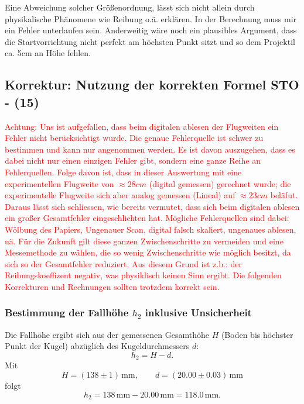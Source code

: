 \documentclass{article}
\begin{document}
\noindent
Eine Abweichung solcher Größenordnung, lässt sich nicht allein durch physikalische Phänomene wie Reibung o.ä. erklären. In der Berechnung muss mir ein Fehler unterlaufen sein. Anderweitig wäre noch ein plausibles Argument, dass die Startvorrichtung nicht perfekt am höchsten Punkt sitzt und so dem Projektil ca. 5cm an Höhe fehlen. 



\subsection{Korrektur: Nutzung der korrekten Formel STO - (15)}



\textcolor{red}{Achtung: Uns ist aufgefallen, dass beim digitalen ablesen der Flugweiten ein Fehler nicht berücksichtigt wurde. Die genaue Fehlerquelle ist schwer zu bestimmen und kann nur angenommen werden. Es ist davon auszugehen, dass es dabei nicht nur einen einzigen Fehler gibt, sondern eine ganze Reihe an Fehlerquellen. Folge davon ist, dass in dieser Auswertung mit eine experimentellen Flugweite von $\approx 28cm$ (digital gemessen) gerechnet wurde; die experimentelle Flugweite sich aber analog gemessen (Lineal) auf $\approx 23cm$ beläfut. Daraus lässt sich schliessen, wie bereits vermutet, dass sich beim digitalen ablesen ein großer Gesamtfehler eingeschlichten hat. Mögliche Fehlerquellen sind dabei: Wölbung des Papiers, Ungenauer Scan, digital falsch skaliert, ungenaues ablesen, uä. Für die Zukunft gilt diese ganzen Zwischenschritte zu vermeiden und eine Messemethode zu wählen, die so wenig Zwischenschritte wie möglich besitzt, da sich so der Gesamtfehler reduziert. Aus diesem Grund ist z.b.: der Reibungskoeffizent negativ, was physiklisch keinen Sinn ergibt. Die folgenden Korrekturen und Rechnungen sollten trotzdem korrekt sein.}




%

\subsubsection*{Bestimmung der Fallhöhe \(h_2\) inklusive Unsicherheit}
Die Fallhöhe ergibt sich aus der gemessenen Gesamthöhe \(H\) (Boden bis höchster Punkt der Kugel)
abzüglich des Kugeldurchmessers \(d\):
\begin{equation}
h_2 = H - d.
\end{equation}
Mit
\begin{equation}
H = (138 \pm 1)\,\mathrm{mm}, \qquad d = (20.00 \pm 0.03)\,\mathrm{mm}
\end{equation}
folgt
\begin{equation}
h_2 = 138\,\mathrm{mm} - 20.00\,\mathrm{mm} = 118.0\,\mathrm{mm}.
\end{equation}
\end{document}
